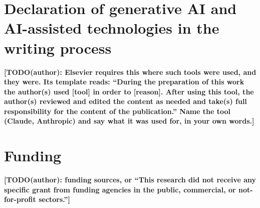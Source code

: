\documentclass[preprint,11pt]{elsarticle}
\newcommand{\authortodo}[1]{{\color{red}\textbf{[TODO(author): #1]}}}
\begin{document}
\section*{Declaration of generative AI and AI-assisted technologies in the writing process}
\authortodo{Elsevier requires this where such tools were used, and they were.
Its template reads: ``During the preparation of this work the author(s) used
[tool] in order to [reason]. After using this tool, the author(s) reviewed and
edited the content as needed and take(s) full responsibility for the content of
the publication.'' Name the tool (Claude, Anthropic) and say what it was used
for, in your own words.}

\section*{Funding}
\authortodo{funding sources, or ``This research did not receive any specific
grant from funding agencies in the public, commercial, or not-for-profit
sectors.''}



\end{document}
